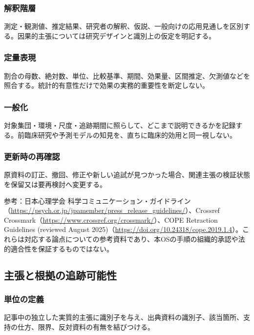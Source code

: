 \documentclass[a4paper,11pt]{article}
\begin{document}
\subsubsection{解釈階層}
\par 測定・観測値、推定結果、研究者の解釈、仮説、一般向けの応用見通しを区別する。因果的主張については研究デザインと識別上の仮定を明記する。\par\medskip
\subsubsection{定量表現}
\par 割合の母数、絶対数、単位、比較基準、期間、効果量、区間推定、欠測値などを照合する。統計的有意性だけで効果の実務的重要性を断定しない。\par\medskip
\subsubsection{一般化}
\par 対象集団・環境・尺度・追跡期間に照らして、どこまで説明できるかを記録する。前臨床研究や予測モデルの知見を、直ちに臨床的効用と同一視しない。\par\medskip
\subsubsection{更新時の再確認}
\par 原資料の訂正、撤回、修正や新しい追試が見つかった場合、関連主張の検証状態を保留又は要再検討へ変更する。\par\medskip
\par 参考：日本心理学会 科学コミュニケーション・ガイドライン（\url{https://psych.or.jp/jpamember/press_release_guidelines/}）、Crossref Crossmark（\url{https://www.crossref.org/crossmark/}）、COPE Retraction Guidelines (reviewed August 2025)（\url{https://doi.org/10.24318/cope.2019.1.4}）。これらは対応する論点についての参考資料であり、本OSの手順の組織的承認や法的適合性を保証するものではない。\par\medskip
\subsection{主張と根拠の追跡可能性}
\subsubsection{単位の定義}
\par 記事中の独立した実質的主張に識別子を与え、出典資料の識別子、該当箇所、支持の仕方、限界、反対資料の有無を結びつける。\par\medskip
\end{document}
